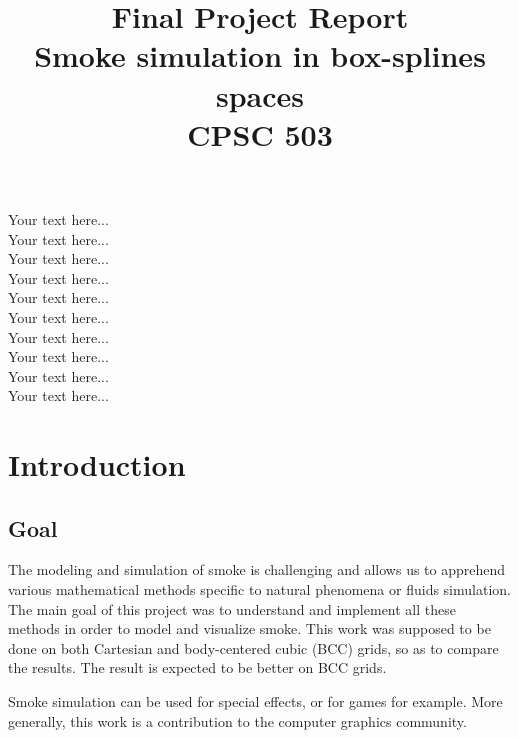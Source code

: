 \documentclass[accepted,single]{gipaper}
\title{Final Project Report \\
Smoke simulation in box-splines spaces\\
CPSC 503}
\affiliation{Department of Computer Science \\University of Calgary
\\\tt{ealtazin@cpsc.ucalgary.ca}}
\begin{document}
\begin{keywords}
Your text here...\\
Your text here...\\
Your text here...\\
Your text here...\\
Your text here...\\
Your text here...\\
Your text here...\\
Your text here...\\
Your text here...\\
Your text here...\\
\end{keywords}


\section{Introduction}

\subsection{Goal}


The modeling and simulation of smoke is challenging and allows us to apprehend various mathematical methods specific to natural phenomena or fluids simulation. The main goal of this project was to understand and implement all these methods in order to model and visualize smoke. This work was supposed to be done on both Cartesian and body-centered cubic (BCC) grids, so as to compare the results. The result is expected to be better on BCC grids.


Smoke simulation can be used for special effects, or for games for example. More generally, this work is a contribution to the computer graphics community.
\end{document}
